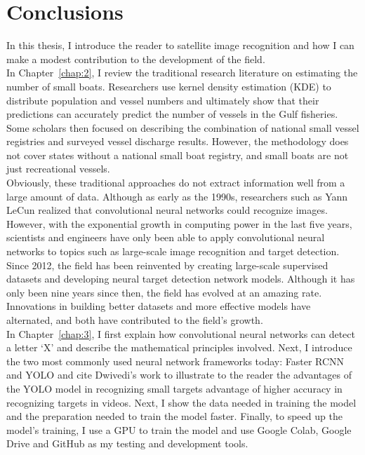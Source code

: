\section{Conclusions}
 In this thesis, I introduce the reader to satellite image recognition and how I can make a modest contribution to the development of the field.\\

In Chapter~\ref{chap:2}, I review the traditional research literature on estimating the number of small boats. Researchers use kernel density estimation (KDE) to distribute population and vessel numbers and ultimately show that their predictions can accurately predict the number of vessels in the Gulf fisheries. Some scholars then focused on describing the combination of national small vessel registries and surveyed vessel discharge results. However, the methodology does not cover states without a national small boat registry, and small boats are not just recreational vessels.\\

Obviously, these traditional approaches do not extract information well from a large amount of data. Although as early as the 1990s, researchers such as Yann LeCun realized that convolutional neural networks could recognize images. However, with the exponential growth in computing power in the last five years, scientists and engineers have only been able to apply convolutional neural networks to topics such as large-scale image recognition and target detection. Since 2012, the field has been reinvented by creating large-scale supervised datasets and developing neural target detection network models. Although it has only been nine years since then, the field has evolved at an amazing rate. Innovations in building better datasets and more effective models have alternated, and both have contributed to the field's growth.\\

In Chapter~\ref{chap:3}, I first explain how convolutional neural networks can detect a letter `X' and describe the mathematical principles involved. Next, I introduce the two most commonly used neural network frameworks today: Faster RCNN and YOLO and cite Dwivedi's work to illustrate to the reader the advantages of the YOLO model in recognizing small targets advantage of higher accuracy in recognizing targets in videos. Next, I show the data needed in training the model and the preparation needed to train the model faster. Finally, to speed up the model's training, I use a GPU to train the model and use Google Colab, Google Drive and GitHub as my testing and development tools.\\


